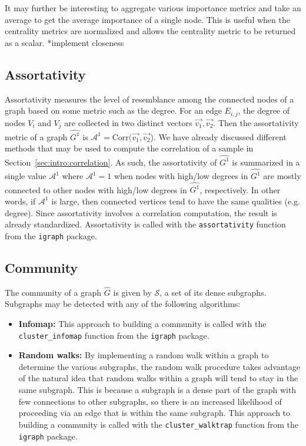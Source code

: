 It may further be interesting to aggregate various importance metrics and take 
an average to get the average importance of a single node. This is useful when 
the centrality metrics are normalized and allows the centrality metric to be 
returned as a scalar. *implement closeness

\subsection{Assortativity}

Assortativity measures the level of resemblance among the connected nodes of a 
graph based on some metric such as the degree. For 
an edge $E_{i,j}$, the degree of nodes $V_i$ and $V_j$ are collected in two 
distinct vectors $\overrightarrow{v_1}, \overrightarrow{v_2}$. Then the 
assortativity metric of a graph $\hat{G^1}$ is $\mathcal{A}^1 = 
\text{Corr}(\overrightarrow{v_1},\overrightarrow{v_2}$). 
We have already discussed different methods that may be used to compute 
the correlation of a sample in Section~\ref{sec:intro:correlation}. As such, 
the assortativity of $\hat{G^1}$ is summarized in a single value 
$\mathcal{A}^1$ where $\mathcal{A}^1=1$ when nodes with high/low degrees in 
$\hat{G^1}$ are mostly connected to other nodes with high/low degrees in 
$\hat{G^1}$, respectively. In other words, if $\mathcal{A}^1$ is large, then 
connected vertices tend to have the same qualities (e.g. degree). Since 
assortativity involves a correlation computation, the result is already 
standardized.
Assortativity is called with the \texttt{assortativity} function from the 
\texttt{igraph} package.

\subsection{Community}

The community of a graph $\hat{G}$ is given by $\mathcal{S}$, a set of its 
dense subgraphs. Subgraphs may be detected with any of the following algorithms:

\tablespacing
\begin{itemize}
	\item \textbf{Infomap:} 
	This approach to building a community is called with the 
	\texttt{cluster\_infomap} function from the \texttt{igraph} package.
	\item \textbf{Random walks:} By implementing a random walk within a graph 
	to determine the various subgraphs, the random walk procedure takes 
	advantage of the natural idea that random walks within a graph will tend to 
	stay in the same subgraph. This is because a subgraph is a dense part of 
	the graph with few connections to other subgraphs, so there is an 
	increased likelihood of proceeding via an edge that is within the same 
	subgraph.
	This approach to building a community is called with the 
	\texttt{cluster\_walktrap} function from the \texttt{igraph} package.
\end{itemize}
\bodyspacing

